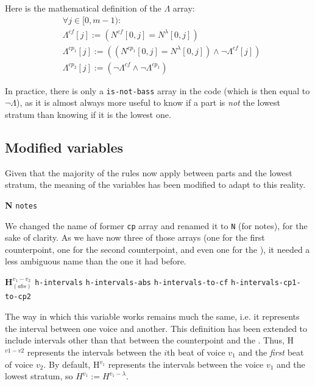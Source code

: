 Here is the mathematical definition of the $\Lambda$ array:
\begin{equation}
\begin{aligned}
&\forall j \in [0, m-1) \colon  \\
&\Lambda^{cf}[j] := (N^{cf}[0,j] = N^\lambda[0,j])\\
&\Lambda^{cp_1}[j] := ((N^{cp_1}[0,j] = N^\lambda[0,j]) \land \neg \Lambda^{cf}[j])\\
&\Lambda^{cp_2}[j] := (\neg \Lambda^{cf} \land \neg \Lambda^{cp_1})
\end{aligned}
\end{equation}

In practice, there is only a \texttt{is-not-bass} array in the code (which is then equal to $\neg \Lambda$), as it is almost always more useful to know if a part is \textit{not} the lowest stratum than knowing if it is the lowest one. 


\subsection{Modified variables} \label{subsection:modified_variables}
Given that the majority of the rules now apply between parts and the lowest stratum, the meaning of the variables has been modified to adapt to this reality. 

\vspace{.5cm} \noindent \textbf{N} \hspace{.2cm} \texttt{notes} 

We changed the name of former \texttt{cp} array and renamed it to \texttt{N} (for notes), for the sake of clarity. As we have now three of those arrays (one for the first counterpoint, one for the second counterpoint, and even one for the \cf), it needed a less ambiguous name than the one it had before.


\vspace{.5cm} \noindent \textbf{H}$_{(abs)}^{v_1-v_2}$ \hspace{.2cm} \texttt{h-intervals}\hspace{.2cm} \texttt{h-intervals-abs}\hspace{.2cm} \texttt{h-intervals-to-cf}\hspace{.2cm} \texttt{h-intervals-cp1-to-cp2}

The way in which this variable works remains much the same, i.e. it represents the interval between one voice and another. This definition has been extended to include intervals other than that between the counterpoint and the \cf. Thus, H$^{v1-v2}$ represents the intervals between the $i$th beat of voice $v_1$ and the \textit{first} beat of voice $v_2$. By default, H$^{v_1}$ represents the intervals between the voice $v_1$ and the lowest stratum, so $H^{v_1} := H^{v_1-\lambda}$.

